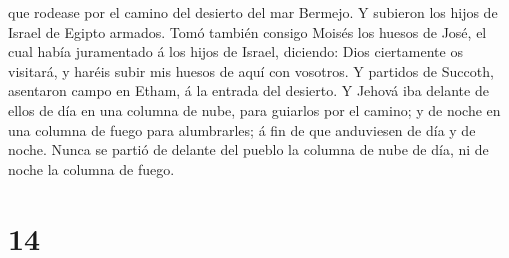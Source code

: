 que rodease por el camino del desierto del mar Bermejo. Y subieron los
hijos de Israel de Egipto armados.  Tomó también consigo
Moisés los huesos de José, el cual había juramentado á los hijos de
Israel, diciendo: Dios ciertamente os visitará, y haréis subir mis
huesos de aquí con vosotros.  Y partidos de Succoth,
asentaron campo en Etham, á la entrada del desierto.  Y
Jehová iba delante de ellos de día en una columna de nube, para guiarlos
por el camino; y de noche en una columna de fuego para alumbrarles; á
fin de que anduviesen de día y de noche.  Nunca se partió
de delante del pueblo la columna de nube de día, ni de noche la columna
de fuego.

\hypertarget{section-13}{%
\section{14}\label{section-13}}

